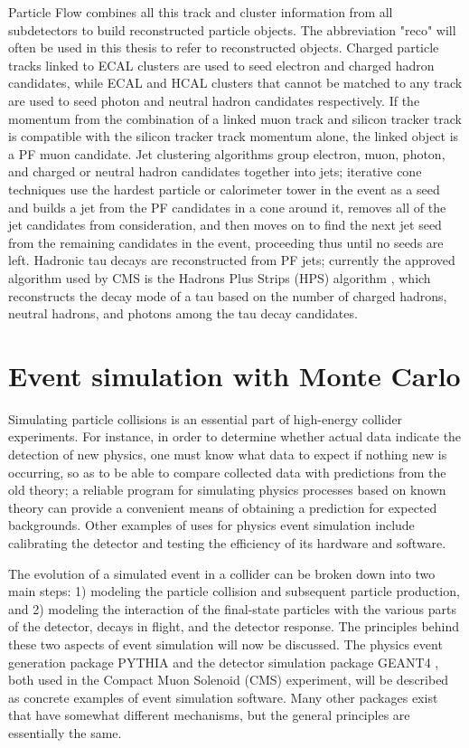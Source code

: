 Particle Flow combines all this track and cluster information from all subdetectors to build reconstructed particle objects. The abbreviation "reco" will often be used in this thesis to refer to reconstructed objects. Charged particle tracks linked to ECAL clusters are used to seed electron and charged hadron candidates, while ECAL and HCAL clusters that cannot be matched to any track are used to seed photon and neutral hadron candidates respectively. If the momentum from the combination of a linked muon track and silicon tracker track is compatible with the silicon tracker track momentum alone, the linked object is a PF muon candidate. Jet clustering algorithms group electron, muon, photon, and charged or neutral hadron candidates together into jets; iterative cone techniques \cite{1126-6708-2008-04-063} use the hardest particle or calorimeter tower in the event as a seed and builds a jet from the PF candidates in a cone around it, removes all of the jet candidates from consideration, and then moves on to find the next jet seed from the remaining candidates in the event, proceeding thus until no seeds are left. Hadronic tau decays are reconstructed from PF jets; currently the approved algorithm used by CMS is the Hadrons Plus Strips (HPS) algorithm \cite{CMS:2011msa}, which reconstructs the decay mode of a tau based on the number of charged hadrons, neutral hadrons, and photons among the tau decay candidates.

\section{Event simulation with Monte Carlo\label{sec:cms-sim}}

Simulating particle collisions is an essential part of high-energy collider experiments. For instance, in order to determine whether actual data indicate the detection of new physics, one must know what data to expect if nothing new is occurring, so as to be able to compare collected data with predictions from the old theory; a reliable program for simulating physics processes based on known theory can provide a convenient means of obtaining a prediction for expected backgrounds. Other examples of uses for physics event simulation include calibrating the detector and testing the efficiency of its hardware and software.

The evolution of a simulated event in a collider can be broken down into two main steps: 1) modeling the particle collision and subsequent particle production, and 2) modeling the interaction of the final-state particles with the various parts of the detector, decays in flight, and the detector response. The principles behind these two aspects of event simulation will now be discussed. The physics event generation package PYTHIA \cite{Sjostrand:2006za} and the detector simulation package GEANT4 \cite{documents:998155}, both used in the Compact Muon Solenoid (CMS) experiment, will be described as concrete examples of event simulation software. Many other packages exist that have somewhat different mechanisms, but the general principles are essentially the same.

